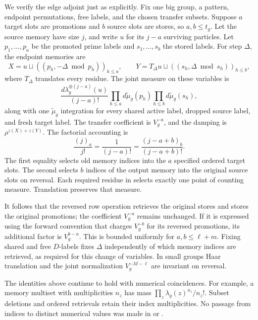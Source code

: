 We verify the edge adjoint just as explicitly.  Fix one big
group, a pattern, endpoint permutations, free labels, and
the chosen transfer subsets.  Suppose $a$ target slots are
promotions and $b$ source slots are stores, so $a,b\le t_g$.
Let the source memory have size $j$, and write $u$ for its
$j-a$ surviving particles.  Let $p_1,\ldots,p_a$ be the
promoted prime labels and $s_1,\ldots,s_b$ the stored labels.
For step $\Delta$, the endpoint memories are
\begin{equation}\label{eq:edge-joint-memory}
 X=u\sqcup((p_h,-\Delta\bmod p_h))_{h\le a},
 \qquad
 Y=T_\Delta u\sqcup((s_h,\Delta\bmod s_h))_{h\le b},
\end{equation}
where $T_\Delta$ translates every residue.  The joint measure
on these variables is
\begin{equation}\label{eq:edge-joint-measure}
 \frac{d\lambda_g^{\otimes(j-a)}(u)}{(j-a)!}
 \prod_{h\le a}d\widetilde\mu_g(p_h)
 \prod_{h\le b}d\widetilde\mu_g(s_h),
\end{equation}
along with one $\widetilde\mu_g$ integration for every shared
active label, dropped source label, and fresh target label.
The transfer coefficient is $V_g^{-a}$, and the damping is
$\rho^{z(X)+z(Y)}$.  The factorial accounting is
\begin{equation}\label{eq:edge-factorial-reversal}
 \frac{(j)_a}{j!}=\frac1{(j-a)!}
 =\frac{(j-a+b)_b}{(j-a+b)!}.
\end{equation}
The first equality selects old memory indices into the $a$
specified ordered target slots.  The second selects $b$
indices of the output memory into the original source slots
on reversal.  Each required residue in
 selects exactly one point of
counting measure.  Translation preserves that measure.

It follows that the reversed row operation retrieves the
original stores and stores the original promotions; the
coefficient $V_g^{-a}$ remains unchanged.  If it is expressed
using the forward convention that charges $V_g^{-b}$ for its
reversed promotions, its additional factor is $V_g^{b-a}$.
This is bounded uniformly for $a,b\le\ell+m$.  Fixing shared
and free $D$-labels fixes $\Delta$ independently of which
memory indices are retrieved, as required for this change
of variables.  In small groups Haar translation and the joint
normalization $V_g^{-M-\ell}$ are invariant on reversal.

The identities above continue to hold with numerical
coincidences.  For example, a memory multiset with multiplicities
$n_z$ has mass $\prod_z\lambda_g(z)^{n_z}/n_z!$.  Subset
deletions and ordered retrievals retain their index
multiplicities.  No passage from indices to distinct numerical
values was made in  or
.

